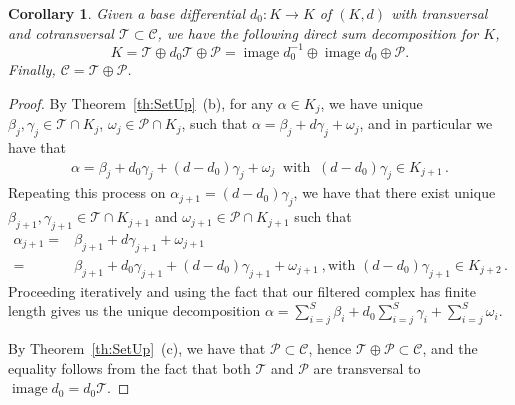 \documentclass[10pt]{amsart}
\newcounter{dummy} \numberwithin{dummy}{section}
\newtheorem{corollary}[dummy]{Corollary}
\theoremstyle{remark}
\newcommand{\calP}{\mathcal{P}}
\newcommand{\calT}{\mathcal{T}}
\newcommand{\calC}{\mathcal{C}}
\DeclareMathOperator{\image}{image}
\numberwithin{equation}{section}
\begin{document}
\begin{corollary} \label{cor:d0Decomp}
Given a base differential $d_0\colon K\to K$ of $(K,d)$ with transversal and cotransversal $\mathcal{T}\subset\mathcal{C}$, we have the following direct sum decomposition for $K$,
$$K = \calT \oplus d_0 \calT \oplus \calP = \image d_0^{-1} \oplus \image d_0 \oplus \calP.$$
Finally, $\calC = \calT \oplus \calP$.
\end{corollary}
\begin{proof}
By Theorem~\ref{th:SetUp}~(b), for any $\alpha \in K_j$, we have unique $\beta_{j}, \gamma_j \in \calT \cap K_j$, $\omega_j \in \calP \cap K_j$, such that $\alpha = \beta_j + d\gamma_j + \omega_j$, and in particular we have that
\begin{align*}
    \alpha = \beta_j + d_0 \gamma_j +(d-d_0)\gamma_j+ \omega_j \ \text{ with }\ (d-d_0) \gamma_j \in K_{j+1}\,.
\end{align*}
Repeating this process on $\alpha_{j+1} = (d-d_0)\gamma_j$, we have that there exist unique $\beta_{j+1},\gamma_{j+1}\in\mathcal{T}\cap K_{j+1}$ and $\omega_{j+1}\in\mathcal{P}\cap K_{j+1}$ such that
\begin{align*}
\alpha_{j+1} =& \beta_{j+1}+d\gamma_{j+1}+\omega_{j+1}\\
=&\beta_{j+1}+d_0\gamma_{j+1}+(d-d_0)\gamma_{j+1}+\omega_{j+1}\ ,\text{
 with 
} (d-d_0)\gamma_{j+1}\in K_{j+2}\,.
\end{align*}
Proceeding iteratively and using the fact that our filtered complex has finite length gives us the unique decomposition $\alpha = \sum_{i=j}^S \beta_i + d_0 \sum_{i=j}^S \gamma_i + \sum_{i=j}^S \omega_i$.

By Theorem~\ref{th:SetUp}~(c), we have that $\calP \subset \calC$, hence $\calT \oplus \calP \subset \calC$, and the equality follows from the fact that both $\mathcal{T}$ and $\mathcal{P}$ are transversal to $\image d_0 = d_0 \calT$.
\end{proof}
\end{document}
